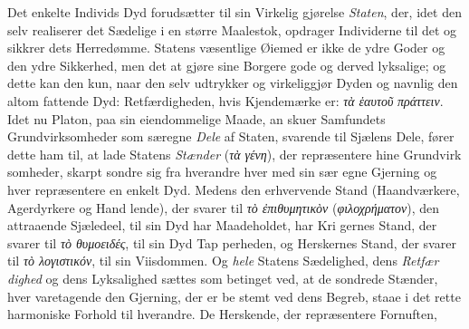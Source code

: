 \documentclass[12pt,a4paper]{book}
\newcommand{\gk}[1]{\textit{#1}}
\begin{document}
Det enkelte Individs Dyd forudsætter til sin Virkelig\-%
gjørelse \emph{Staten}, der, idet den selv realiserer det Sædelige i
en større Maalestok, opdrager Individerne til det og sikkrer
dets Herredømme. Statens væsentlige Øiemed er ikke de ydre
Goder og den ydre Sikkerhed, men det at gjøre sine Borgere
gode og derved lyksalige; og dette kan den kun, naar den
selv udtrykker og virkeliggjør Dyden og navnlig den altom\-%
fattende Dyd: Retfærdigheden, hvis Kjendemærke er: \gk{τὰ ἑαυτοῦ}
\gk{πράττειν}. Idet nu Platon, paa sin eiendommelige Maade, an\-%
skuer Samfundets Grundvirksomheder som særegne \emph{Dele} af
Staten, svarende til Sjælens Dele, fører dette ham til, at lade
Statens \emph{Stænder} (\gk{τὰ γένη}), der repræsentere hine Grundvirk\-%
somheder, skarpt sondre sig fra hverandre hver med sin sær\-%
egne Gjerning og hver repræsentere en enkelt Dyd. Medens
den erhvervende Stand (Haandværkere, Agerdyrkere og Hand\-%
lende), der svarer til \gk{τὸ ἐπιθυμητικὸν} (\gk{φιλοχρήματον}), den
attraaende Sjæledeel, til sin Dyd har Maadeholdet, har Kri\-%
gernes Stand, der svarer til \gk{τὸ θυμοειδές}, til sin Dyd Tap\-%
perheden, og Herskernes Stand, der svarer til \gk{τὸ λογιστικόν}, til
sin Viisdommen. Og \emph{hele} Statens Sædelighed, dens \emph{Retfær\-%
dighed} og dens Lyksalighed sættes som betinget ved, at de
sondrede Stænder, hver varetagende den Gjerning, der er be\-%
stemt ved dens Begreb, staae i det rette harmoniske Forhold
til hverandre. De Herskende, der repræsentere Fornuften,
\end{document}
